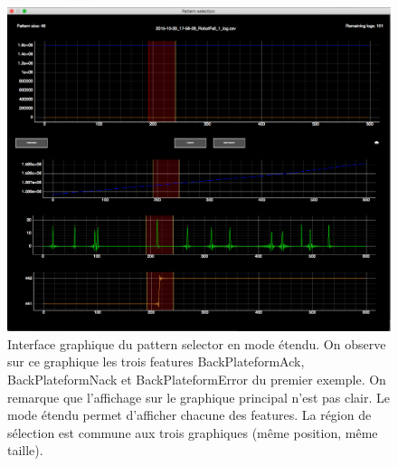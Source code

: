 \begin{figure}[h]
	\centering\includegraphics[width=14cm]{images/pattern_selector_ext.png}
	\caption[Interface graphique du pattern selector en mode étendu]{Interface graphique du pattern selector en mode étendu. On observe sur ce graphique les trois features BackPlateformAck, BackPlateformNack et BackPlateformError du premier exemple. On remarque que l'affichage sur le graphique principal n'est pas clair. Le mode étendu permet d'afficher chacune des features. La région de sélection est commune aux trois graphiques (même position, même taille).}
	\label{fig:Interface graphique du pattern selector en mode étendu}
\end{figure}

